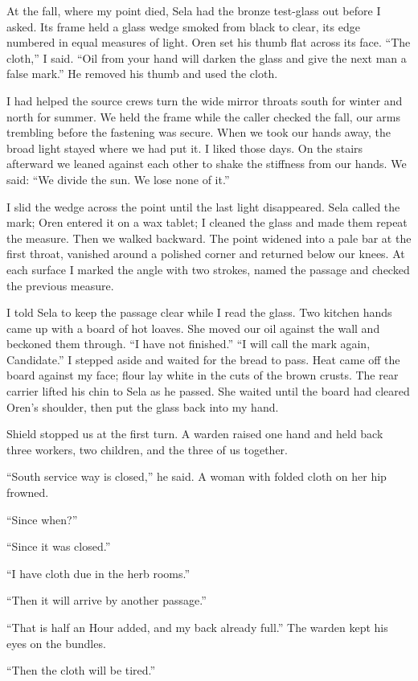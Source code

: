 At the fall, where my point died, Sela had the bronze test-glass out before I asked. Its frame held a glass wedge smoked from black to clear, its edge numbered in equal measures of light. Oren set his thumb flat across its face. ``The cloth,'' I said. ``Oil from your hand will darken the glass and give the next man a false mark.'' He removed his thumb and used the cloth.\par

I had helped the source crews turn the wide mirror throats south for winter and north for summer. We held the frame while the caller checked the fall, our arms trembling before the fastening was secure. When we took our hands away, the broad light stayed where we had put it. I liked those days. On the stairs afterward we leaned against each other to shake the stiffness from our hands. We said: ``We divide the sun. We lose none of it.''\par

I slid the wedge across the point until the last light disappeared. Sela called the mark; Oren entered it on a wax tablet; I cleaned the glass and made them repeat the measure. Then we walked backward. The point widened into a pale bar at the first throat, vanished around a polished corner and returned below our knees. At each surface I marked the angle with two strokes, named the passage and checked the previous measure. \par

I told Sela to keep the passage clear while I read the glass. Two kitchen hands came up with a board of hot loaves. She moved our oil against the wall and beckoned them through. ``I have not finished.'' ``I will call the mark again, Candidate.'' I stepped aside and waited for the bread to pass. Heat came off the board against my face; flour lay white in the cuts of the brown crusts. The rear carrier lifted his chin to Sela as he passed. She waited until the board had cleared Oren's shoulder, then put the glass back into my hand.\par

\ornament

Shield stopped us at the first turn. A warden raised one hand and held back three workers, two children, and the three of us together. \par
``South service way is closed,'' he said. A woman with folded cloth on her hip frowned. \par
``Since when?''\par
``Since it was closed.''\par
``I have cloth due in the herb rooms.''\par
``Then it will arrive by another passage.''\par
``That is half an Hour added, and my back already full.'' The warden kept his eyes on the bundles. \par
``Then the cloth will be tired.''\par

